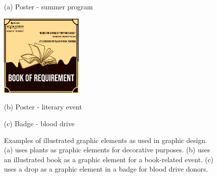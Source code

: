 \documentclass{article}
\begin{document}
\begin{figure}[htb]
\begin{minipage}[b]{1.0\linewidth}
  \centering
  \centerline{
  {%
  \setlength{\fboxsep}{0pt}%
  \setlength{\fboxrule}{1pt}%
  }%
  }
  \centerline{(a) Poster - summer program}\medskip
\end{minipage}
%
\begin{minipage}[b]{.48\linewidth}
  \centering
  \centerline{\includegraphics[width=4.0cm]{Figures/poster1.png}}
  \centerline{(b) Poster - literary event}\medskip
\end{minipage}
\hfill
\begin{minipage}[b]{0.48\linewidth}
  \centering
  \centerline{
  {%
  \setlength{\fboxsep}{0pt}%
  \setlength{\fboxrule}{1pt}%
  }%
  }
  \centerline{(c) Badge - blood drive}\medskip
\end{minipage}
%
\caption{Examples of illustrated graphic elements as used in graphic design. (a) uses plants as graphic elements for decorative purposes. (b) uses an illustrated book as a graphic element for a book-related event. (c) uses a drop as a graphic element in a badge for blood drive donors.}
\label{fig:examples}
%
\end{figure}
\end{document}
